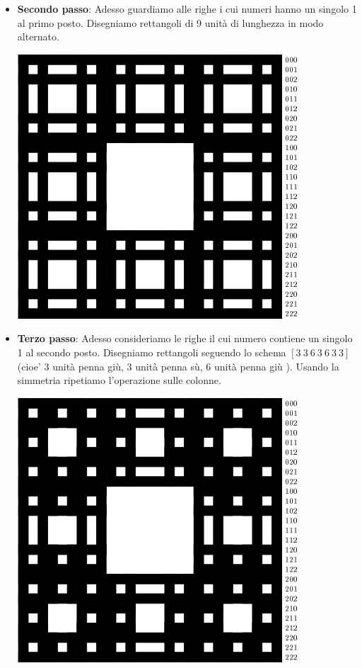 \begin{itemize}
	\vspace{0.2cm}
	\item [\textbullet] \textbf{Secondo passo}: Adesso guardiamo alle righe i cui numeri hanno un singolo 1 al primo posto. Disegniamo rettangoli di 9 unità di lunghezza in modo alternato.
	\begin{center}
		\includegraphics{pics/menger-schema04.png}
	\end{center} 
	\item [\textbullet] \textbf{Terzo passo}: Adesso consideriamo le righe il cui numero contiene un singolo 1 al secondo posto. Disegniamo rettangoli seguendo lo schema $[3\ 3\ 6\ 3\ 6\ 3\ 3]$ (cioe' 3 unità penna giù, 3 unità penna sù, 6 unità penna giù \textellipsis). Usando la simmetria ripetiamo l'operazione sulle colonne.
	\begin{center}
		\includegraphics{pics/menger-schema05.png}

\end{center}
\end{itemize}
